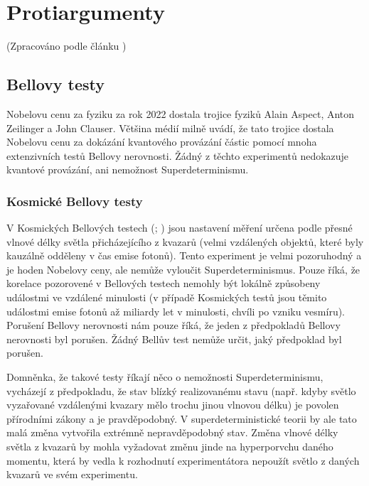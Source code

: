 \section{Protiargumenty}
(Zpracováno podle článku \cite{supdet:rethink})
\subsection{Bellovy testy}


Nobelovu cenu za fyziku za rok 2022 dostala trojice fyziků Alain Aspect, Anton Zeilinger a John Clauser. Většina médií milně uvádí, že tato trojice dostala Nobelovu cenu za dokázání kvantového provázání částic pomocí mnoha extenzivních testů Bellovy nerovnosti. Žádný z těchto experimentů nedokazuje kvantové provázání, ani nemožnost Superdeterminismu.

\subsubsection{Kosmické Bellovy testy}
V Kosmických Bellových testech (\cite{CosBTest:1}; \cite{CosBTest:2}) jsou nastavení měření určena podle přesné vlnové délky světla přicházejícího z kvazarů (velmi vzdálených objektů, které byly kauzálně odděleny v čas emise fotonů). Tento experiment je velmi pozoruhodný a je hoden Nobelovy ceny, ale nemůže vyloučit Superdeterminismus. Pouze říká, že korelace pozorovené v Bellových testech nemohly být lokálně způsobeny událostmi ve vzdálené minulosti (v případě Kosmických testů jsou těmito událostmi emise fotonů až miliardy let v minulosti, chvíli po vzniku vesmíru). Porušení Bellovy nerovnosti nám pouze říká, že jeden z předpokladů Bellovy nerovnosti byl porušen. Žádný Bellův test nemůže určit, jaký předpoklad byl porušen.

Domněnka, že takové testy říkají něco o nemožnosti Superdeterminismu, vycházejí z předpokladu, že stav blízký realizovanému stavu (např. kdyby světlo vyzařované vzdálenými kvazary mělo trochu jinou vlnovou délku) je povolen přírodními zákony a je pravděpodobný. V superdeterministické teorii by ale tato malá změna vytvořila extrémně nepravděpodobný stav. Změna vlnové délky světla z kvazarů by mohla vyžadovat změnu jinde na hyperporvchu daného momentu, která by vedla k rozhodnutí experimentátora nepoužít světlo z daných kvazarů ve svém experimentu.
\clearpage

